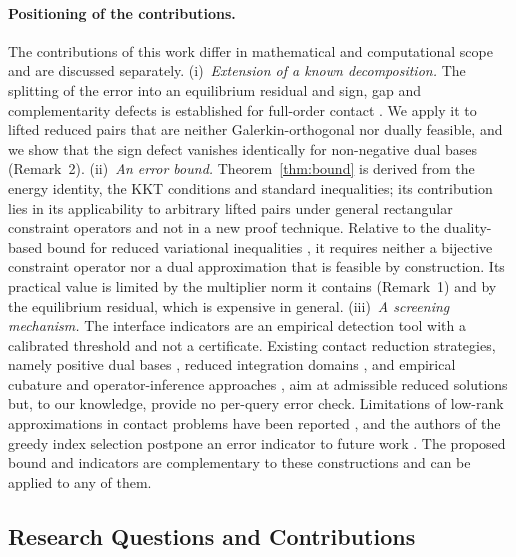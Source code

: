\documentclass[11pt,a4paper]{article}
\begin{document}
\paragraph{Positioning of the contributions.}
The contributions of this work differ in mathematical and computational scope and are discussed separately. (i)~\emph{Extension of a known decomposition.} The splitting of the error into an equilibrium residual and sign, gap and complementarity defects is established for full-order contact \cite{hild2007residual, dabaghi2020posteriori, banz2024generic, banz2026posteriori}. We apply it to lifted reduced pairs that are neither Galerkin-orthogonal nor dually feasible, and we show that the sign defect vanishes identically for non-negative dual bases (Remark~2). (ii)~\emph{An error bound.} Theorem~\ref{thm:bound} is derived from the energy identity, the KKT conditions and standard inequalities; its contribution lies in its applicability to arbitrary lifted pairs under general rectangular constraint operators and not in a new proof technique. Relative to the duality-based bound for reduced variational inequalities \cite{zhang2014duality}, it requires neither a bijective constraint operator nor a dual approximation that is feasible by construction. Its practical value is limited by the multiplier norm it contains (Remark~1) and by the equilibrium residual, which is expensive in general. (iii)~\emph{A screening mechanism.} The interface indicators are an empirical detection tool with a calibrated threshold and not a certificate. Existing contact reduction strategies, namely positive dual bases \cite{balajewicz2016projection, benaceur2020reduced, sambataro2026model}, reduced integration domains \cite{fauque2018hybrid, leberre2022condition}, and empirical cubature and operator-inference approaches \cite{koller2021hyper, aresdeparga2023petrov, manvelyan2026inference}, aim at admissible reduced solutions but, to our knowledge, provide no per-query error check. Limitations of low-rank approximations in contact problems have been reported \cite{kollepara2022limitations}, and the authors of the greedy index selection postpone an error indicator to future work \cite{sambataro2026model}. The proposed bound and indicators are complementary to these constructions and can be applied to any of them.

\subsection*{Research Questions and Contributions}
\end{document}
